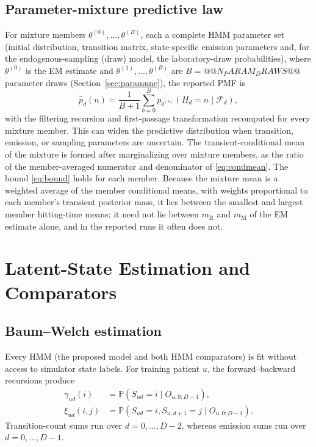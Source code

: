 \documentclass{ieeeaccess}
\newcommand{\R}{\mathrm{R}}
\newcommand{\M}{\mathrm{M}}
\newcommand{\Prb}{\mathbb P}
\begin{document}
\subsection{Parameter-mixture predictive law}
For mixture members $\theta^{(0)},\ldots,\theta^{(B)}$, each a complete HMM parameter set (initial distribution, transition matrix, state-specific emission parameters and, for the endogenous-sampling (draw) model, the laboratory-draw probabilities), where $\theta^{(0)}$ is the EM estimate and $\theta^{(1)},\ldots,\theta^{(B)}$ are $B=@@N_PARAM_DRAWS@@$ parameter draws (Section~\ref{sec:paramunc}), the reported PMF is
\begin{equation}
\widehat p_d(n)=\frac{1}{B+1}\sum_{b=0}^{B}
 p_{\theta^{(b)}}(H_d=n\mid\mathcal F_d),
\end{equation}
with the filtering recursion and first-passage transformation recomputed for every mixture member. This can widen the predictive distribution when transition, emission, or sampling parameters are uncertain. The transient-conditional mean of the mixture is formed after marginalizing over mixture members, as the ratio of the member-averaged numerator and denominator of \eqref{eq:condmean}. The bound \eqref{eq:bound} holds for each member. Because the mixture mean is a weighted average of the member conditional means, with weights proportional to each member's transient posterior mass, it lies between the smallest and largest member hitting-time means; it need not lie between $m_{\R}$ and $m_{\M}$ of the EM estimate alone, and in the reported runs it often does not.

\section{Latent-State Estimation and Comparators}\label{sec:estimation}
\subsection{Baum--Welch estimation}
Every HMM (the proposed model and both HMM comparators) is fit without access to simulator state labels. For training patient $u$, the forward--backward recursions produce
\begin{align}
\gamma_{ud}(i)&=\Prb(S_{ud}=i\mid O_{u,0:D-1}),\\
\xi_{ud}(i,j)&=\Prb(S_{ud}=i,S_{u,d+1}=j\mid O_{u,0:D-1}).
\end{align}
Transition-count sums run over $d=0,\ldots,D-2$, whereas emission sums run over $d=0,\ldots,D-1$.
\end{document}
